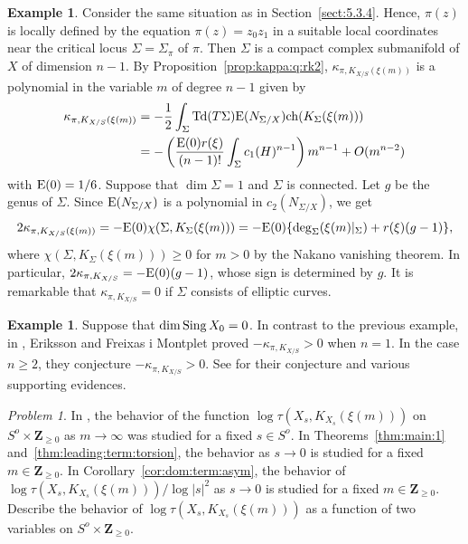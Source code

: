 \documentclass[amscd, leqno]{amsart}
\theoremstyle{plain}
\theoremstyle{definition}
\newtheorem{example}[theorem]{Example}
\theoremstyle{remark}
\newtheorem{problem}[theorem]{Problem}
\begin{document}
\begin{example}
\label{ex:quad:sing}
Consider the same situation as in Section~\ref{sect:5.3.4}. Hence, $\pi(z)$ is locally defined by the equation $\pi(z)=z_{0}z_{1}$
in a suitable local coordinates near the critical locus $\Sigma = \Sigma_{\pi}$ of $\pi$. Then $\Sigma$ is a compact complex submanifold 
of $X$ of dimension $n-1$. By Proposition~\ref{prop:kappa:q:rk2}, $\kappa_{\pi, K_{X/S}(\xi(m))} $ is a polynomial in the variable $m$ 
of degree $n-1$ given by
$$
\begin{aligned}
\kappa_{\pi, K_{X/S}(\xi(m))} 
&= 
-\frac{1}{2} \int_{\Sigma} {\rm Td}(T\Sigma) {\rm E}(N_{\Sigma/X}) {\rm ch}(K_{\Sigma}(\xi(m)))
\\
&=
-\left( \frac{{\rm E}(0)r(\xi)}{(n-1)!}\int_{\Sigma}c_{1}(H)^{n-1} \right) m^{n-1} + O(m^{n-2})
\end{aligned}
$$
with ${\rm E}(0)=1/6$. Suppose that $\dim \Sigma =1$ and $\Sigma$ is connected. Let $g$ be the genus of $\Sigma$. 
Since ${\rm E}(N_{\Sigma/X})$ is a polynomial in $c_{2}(N_{\Sigma/X})$, we get
$$
2\kappa_{\pi, K_{X/S}(\xi(m))} = -{\rm E}(0) \chi(\Sigma, K_{\Sigma}(\xi(m))) = -{\rm E}(0)\{ \deg_{\Sigma} (\xi(m)|_{\Sigma}) + r(\xi)(g-1) \},
$$
where $\chi(\Sigma, K_{\Sigma}(\xi(m))) \geq 0$ for $m>0$ by the Nakano vanishing theorem.
In particular, $2\kappa_{\pi, K_{X/S}} = -{\rm E}(0)(g-1)$, whose sign is determined by $g$. 
It is remarkable that $\kappa_{\pi, K_{X/S}} = 0$ if $\Sigma$ consists of elliptic curves.
\end{example}


\begin{example}
Suppose that $\dim {\rm Sing}\,X_{0}=0$.
In contrast to the previous example, in \cite{ErikssonFreixas26}, Eriksson and Freixas i Montplet proved $-\kappa_{\pi,K_{X/S}} > 0$ 
when $n=1$. In the case $n\geq 2$, they conjecture $-\kappa_{\pi,K_{X/S}} > 0$.
See \cite[Conjecture, Theorems A and B]{ErikssonFreixas26} for their conjecture and various supporting evidences.
\end{example}


\begin{problem}
In \cite{BermanBoucksom10, BismutVasserot89, Finski18}, the behavior of the function $\log \tau(X_{s}, K_{X_{s}}(\xi(m)))$ on 
$S^{o} \times {\mathbf Z}_{\geq0}$ as $m \to \infty$ was studied for a fixed $s \in S^{o}$. 
In Theorems~\ref{thm:main:1} and~\ref{thm:leading:term:torsion}, the behavior as $s \to 0$ is studied for a fixed $m \in {\mathbf Z}_{\geq0}$.
In Corollary~\ref{cor:dom:term:asym}, the behavior of $\log \tau(X_{s}, K_{X_{s}}(\xi(m))) / \log |s|^{2}$ as $s\to0$ is studied
for a fixed $m \in {\mathbf Z}_{\geq0}$. 
Describe the behavior of $\log \tau(X_{s}, K_{X_{s}}(\xi(m)))$ as a function of two variables on $S^{o} \times {\mathbf Z}_{\geq0}$.
\end{problem}
\end{document}

